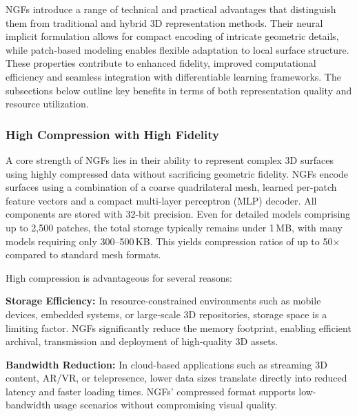 NGFs introduce a range of technical and practical advantages that distinguish them from traditional and hybrid 3D representation methods. 
Their neural implicit formulation allows for compact encoding of intricate geometric details, while patch-based modeling enables flexible adaptation to local surface structure. 
These properties contribute to enhanced fidelity, improved computational efficiency and seamless integration with differentiable learning frameworks. 
The subsections below outline key benefits in terms of both representation quality and resource utilization. 

\subsubsection{High Compression with High Fidelity}

A core strength of NGFs lies in their ability to represent complex 3D surfaces using highly compressed data without sacrificing geometric fidelity. 
NGFs encode surfaces using a combination of a coarse quadrilateral mesh, learned per-patch feature vectors and a compact multi-layer perceptron (MLP) decoder. 
All components are stored with 32-bit precision. 
Even for detailed models comprising up to 2,500 patches, the total storage typically remains under 1\,MB, with many models requiring only 300--500\,KB. 
This yields compression ratios of up to 50$\times$ compared to standard mesh formats. 

High compression is advantageous for several reasons: 

\textbf{Storage Efficiency:} In resource-constrained environments such as mobile devices, embedded systems, or large-scale 3D repositories, storage space is a limiting factor. 
NGFs significantly reduce the memory footprint, enabling efficient archival, transmission and deployment of high-quality 3D assets. 

\textbf{Bandwidth Reduction:} In cloud-based applications such as streaming 3D content, AR/VR, or telepresence, lower data sizes translate directly into reduced latency and faster loading times. 
NGFs’ compressed format supports low-bandwidth usage scenarios without compromising visual quality. 

\begin{table}[h]
\centering
{}
\caption{Compression Comparison (Chamfer Distance × $10^5$)}
\end{table}

